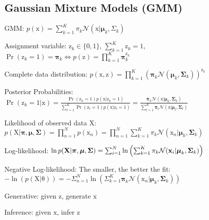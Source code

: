 \documentclass[a4paper, 11pt, landscape]{article}
\newcommand{\matr}[1]{\boldsymbol{\mathrm{#1}}}
\begin{document}
\begin{multicols*}{3}
\section{Gaussian Mixture Models (GMM)}
\begin{compactdesc}
	\item[GMM:] $p(\matr{x}) = \sum_{k=1}^K \pi_k \mathcal{N}(\matr{x} | \boldsymbol{\mu}_k, \Sigma_k)$
	\item[Assignment variable:] $\matr{z}_k \in \{0, 1\}$, $\sum_{k=1}^K \matr{z}_k = 1$, $\operatorname{Pr}(\matr{z}_k = 1) = \boldsymbol{\pi}_k \Leftrightarrow p(\matr{z}) = \prod_{k=1}^K \boldsymbol{\pi}_k^{\matr{z}_k}$
	\item[Complete data distribution:] $p(\matr{x}, \matr{z}) = \prod_{k=1}^K \left( \boldsymbol{\pi}_k \mathcal{N}(\boldsymbol{\mu}_k, \boldsymbol{\Sigma}_k) \right)^{\matr{z}_k}$
	\item[Posterior Probabilities:] $\operatorname{Pr}(\matr{z}_k = 1 | \matr{x}) = \frac{\operatorname{Pr}(\matr{z}_k = 1) p(\matr{x} | \matr{z}_k = 1)}{\sum_{l=1}^K \operatorname{Pr}(\matr{z}_l = 1) p(\matr{x} | \matr{z}_l = 1)} = \frac{\boldsymbol{\pi}_k \mathcal{N}(\matr{x} | \boldsymbol{\mu}_k, \boldsymbol{\Sigma}_k)}{\sum_{l=1}^K \boldsymbol{\pi}_l \mathcal{N}(\matr{x} | \boldsymbol{\mu}_l, \boldsymbol{\Sigma}_l)}$
	\item[Likelihood of observed data $\matr{X}$:] $p(\matr{X} | \boldsymbol{\pi}, \boldsymbol{\mu}, \boldsymbol{\Sigma}) = \prod_{n=1}^N p(\matr{x}_n) = \prod_{n=1}^N \sum_{k=1}^K \pi_k \mathcal{N}(\matr{x}_n | \boldsymbol{\mu}_k, \boldsymbol{\Sigma}_k)$
	\item[Log-likelihood:] $\ln p(\matr{X} | \boldsymbol{\pi}, \boldsymbol{\mu}, \boldsymbol{\Sigma}) =\break \sum_{i=1}^N \ln \left( \sum_{k=1}^K \pi_k \mathcal{N}(\matr{x}_i | \boldsymbol{\mu}_k, \boldsymbol{\Sigma}_k) \right)$
	\item[Negative Log-likelihood:] The smaller, the better the fit: $-\ln(p(\matr{X} | \matr{\theta})) = -\Sigma_{n=1}^N \ln\left( \Sigma_{k=1}^K \boldsymbol{\pi}_k \mathcal{N}(\matr{x}_n | \boldsymbol{\mu}_k, \boldsymbol{\Sigma}_k) \right)$
\end{compactdesc}
\begin{compactitem}
	\item Generative: given $\matr{z}$, generate $\matr{x}$
	\item Inference: given $\matr{x}$, infer $\matr{z}$
\end{compactitem}



\end{multicols*}
\end{document}
